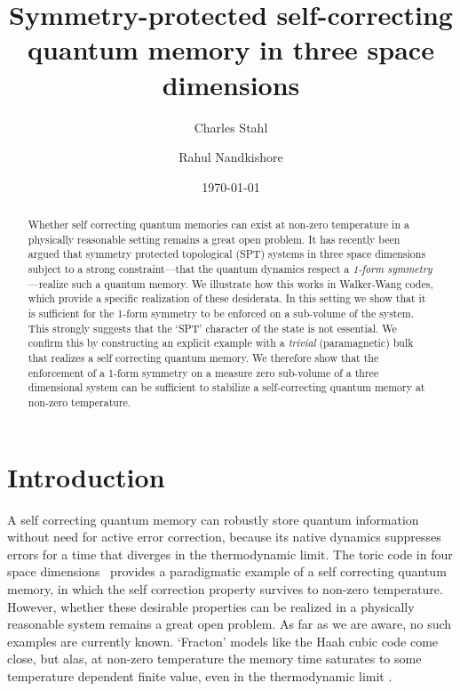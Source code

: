 \documentclass[twocolumn, longbibliography]{revtex4-2}
\begin{document}
\title{Symmetry-protected self-correcting quantum memory in three space dimensions}
\author{Charles Stahl}
\author{Rahul Nandkishore}

	
\begin{abstract}
Whether self correcting quantum memories can exist at non-zero temperature in a physically reasonable setting remains a great open problem. It has recently been argued \cite{RobertsBartlett} that symmetry protected topological (SPT) systems in three space dimensions subject to a strong constraint---that the quantum dynamics respect a {\it 1-form symmetry}---realize such a quantum memory. We illustrate how this works in Walker-Wang codes, which provide a specific realization of these desiderata. In this setting we show that it is sufficient for the 1-form symmetry to be enforced on a sub-volume of the system. This strongly suggests that the `SPT' character of the state is not essential. We confirm this by constructing an explicit example with a {\it trivial} (paramagnetic) bulk that realizes a self correcting quantum memory. We therefore show that the enforcement of a 1-form symmetry on a measure zero sub-volume of a three dimensional system can be sufficient to stabilize a self-correcting quantum memory at non-zero temperature. 
\end{abstract}

\date{\today}

\maketitle

\section{Introduction}
A self correcting quantum memory can robustly store quantum information without need for active error correction, because its native dynamics suppresses errors for a time that diverges in the thermodynamic limit. The toric code in four space dimensions~\cite{Kitaev2003} provides a paradigmatic example of a self correcting quantum memory, in which the self correction property survives to non-zero temperature. However, whether these desirable properties can be realized in a physically reasonable system remains a great open problem. As far as we are aware, no such examples are currently known. `Fracton' models like the Haah cubic code \cite{HaahCode} come close, but alas, at non-zero temperature the memory time saturates to some temperature dependent finite value, even in the thermodynamic limit \cite{Siva2017, PremHaahNandkishore}. 
\end{document}
